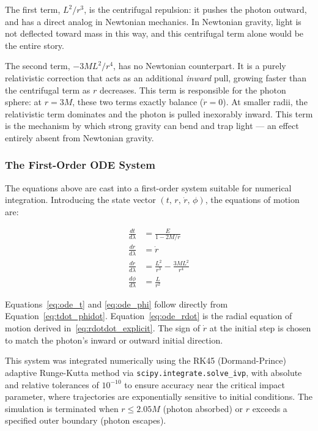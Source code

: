 \documentclass[12pt,a4paper]{article}
\begin{document}
The first term, $L^2/r^3$, is the centrifugal repulsion: it pushes the photon outward, and has a direct analog in Newtonian mechanics. In Newtonian gravity, light is not deflected toward mass in this way, and this centrifugal term alone would be the entire story.

The second term, $-3ML^2/r^4$, has no Newtonian counterpart. It is a purely relativistic correction that acts as an additional \textit{inward} pull, growing faster than the centrifugal term as $r$ decreases. This term is responsible for the photon sphere: at $r = 3M$, these two terms exactly balance ($\ddot{r} = 0$). At smaller radii, the relativistic term dominates and the photon is pulled inexorably inward. This term is the mechanism by
which strong gravity can bend and trap light — an effect entirely absent from Newtonian gravity.

\subsubsection{The First-Order ODE System}
The equations above are cast into a first-order system suitable for numerical integration. Introducing the state vector $(t,\, r,\, \dot{r},\, \phi)$, the equations of motion are:

\begin{align}
    \frac{dt}{d\lambda} &= \frac{E}{1 - 2M/r}
    \label{eq:ode_t}\\[6pt]
    \frac{dr}{d\lambda} &= \dot{r}
    \label{eq:ode_r}\\[6pt]
    \frac{d\dot{r}}{d\lambda} &= \frac{L^2}{r^3} - \frac{3ML^2}{r^4}
    \label{eq:ode_rdot}\\[6pt]
    \frac{d\phi}{d\lambda} &= \frac{L}{r^2}
    \label{eq:ode_phi}
\end{align}

Equations~\eqref{eq:ode_t} and \eqref{eq:ode_phi} follow directly from Equation~\eqref{eq:tdot_phidot}. Equation~\eqref{eq:ode_rdot} is the radial equation of motion derived in~\eqref{eq:rdotdot_explicit}. The sign of $\dot{r}$ at the initial step is chosen to match the photon's inward or outward initial direction.

This system was integrated numerically using the RK45 (Dormand-Prince) adaptive Runge-Kutta method via \texttt{scipy.integrate.solve\_ivp}, with absolute and relative tolerances of $10^{-10}$ to ensure accuracy near the critical impact parameter, where trajectories are exponentially sensitive to initial conditions. The simulation is terminated when $r \leq 2.05M$ (photon absorbed) or $r$ exceeds a specified outer boundary
(photon escapes).
\end{document}
